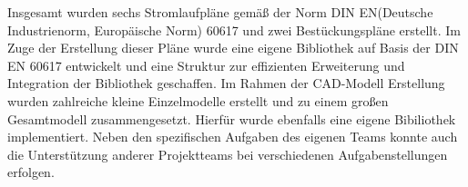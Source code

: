 Insgesamt wurden sechs Stromlaufpläne gemäß der Norm DIN EN(Deutsche Industrienorm, Europäische Norm) 60617 und zwei Bestückungspläne erstellt. Im Zuge der Erstellung dieser Pläne wurde eine eigene Bibliothek auf Basis der DIN EN 60617 entwickelt und eine Struktur zur effizienten Erweiterung und Integration der Bibliothek geschaffen. Im Rahmen der CAD-Modell Erstellung wurden zahlreiche kleine Einzelmodelle erstellt und zu einem großen Gesamtmodell zusammengesetzt. Hierfür wurde ebenfalls eine eigene Bibiliothek implementiert. Neben den spezifischen Aufgaben des eigenen Teams konnte auch die Unterstützung anderer Projektteams bei verschiedenen Aufgabenstellungen erfolgen.



\clearpage
